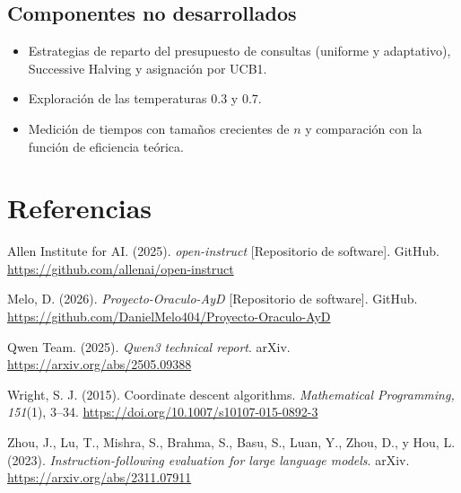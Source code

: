 \documentclass[12pt,letterpaper]{article}
\theoremstyle{definition}
\begin{document}
\subsection{Componentes no desarrollados}\label{sec:pendiente}
\begin{itemize}[leftmargin=*]
\item Estrategias de reparto del presupuesto de consultas (uniforme y adaptativo), Successive Halving y asignación por UCB1.
\item Exploración de las temperaturas 0.3 y 0.7.
\item Medición de tiempos con tamaños crecientes de $n$ y comparación con la función de eficiencia teórica.
\end{itemize}

\section*{Referencias}
\begingroup
\setlength{\parindent}{-1.27cm}
\setlength{\leftskip}{1.27cm}
\raggedright

Allen Institute for AI. (2025). \textit{open-instruct} [Repositorio de software]. GitHub. \url{https://github.com/allenai/open-instruct}

Melo, D. (2026). \textit{Proyecto-Oraculo-AyD} [Repositorio de software]. GitHub. \url{https://github.com/DanielMelo404/Proyecto-Oraculo-AyD}

Qwen Team. (2025). \textit{Qwen3 technical report}. arXiv. \url{https://arxiv.org/abs/2505.09388}

Wright, S. J. (2015). Coordinate descent algorithms. \textit{Mathematical Programming, 151}(1), 3--34. \url{https://doi.org/10.1007/s10107-015-0892-3}

Zhou, J., Lu, T., Mishra, S., Brahma, S., Basu, S., Luan, Y., Zhou, D., y Hou, L. (2023). \textit{Instruction-following evaluation for large language models}. arXiv. \url{https://arxiv.org/abs/2311.07911}

\endgroup
\end{document}
